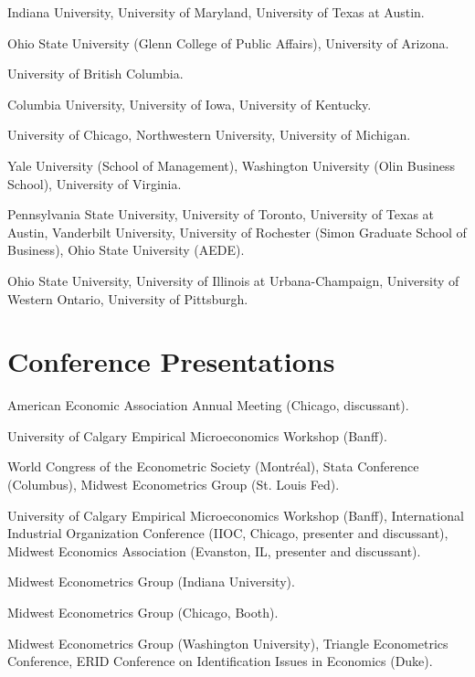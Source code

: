 \documentclass[10pt,letterpaper]{article}
\begin{document}
\begin{description}[font=\mdseries]
\item[2017]
  Indiana University,
  University of Maryland,
  University of Texas at Austin.
\item[2016]
  Ohio State University (Glenn College of Public Affairs),
  University of Arizona.
\item[2015]
  University of British Columbia.
\item[2014]
  Columbia University,
  University of Iowa,
  University of Kentucky.
\item[2013]
  University of Chicago,
  Northwestern University,
  University of Michigan.
\item[2012]
  Yale University (School of Management),
  Washington University (Olin Business School),
  University of Virginia.
\item[2011]
  Pennsylvania State University,
  University of Toronto,
  University of Texas at Austin,
  Vanderbilt University,
  University of Rochester (Simon Graduate School of Business),
  Ohio State University (AEDE).
\item[2010]
  Ohio State University,
  University of Illinois at Urbana-Champaign,
  University of Western Ontario,
  University of Pittsburgh.
\end{description}

\section*{Conference Presentations}

\begin{description}[font=\mdseries]
\item[2017]
  American Economic Association Annual Meeting (Chicago, discussant).
\item[2016]
  University of Calgary Empirical Microeconomics Workshop (Banff).
\item[2015]
  World Congress of the Econometric Society (Montr\'{e}al),
  Stata Conference (Columbus),
  Midwest Econometrics Group (St. Louis Fed).
\item[2014]
  University of Calgary Empirical Microeconomics Workshop (Banff),
  International Industrial Organization Conference (IIOC, Chicago, presenter and discussant),
  Midwest Economics Association (Evanston, IL, presenter and discussant).
\item[2013]
  Midwest Econometrics Group (Indiana University).
\item[2011]
  Midwest Econometrics Group (Chicago, Booth).
\item[2010]
  Midwest Econometrics Group (Washington University),
  Triangle Econometrics Conference,
  ERID Conference on Identification Issues in Economics (Duke).
\end{description}
\end{document}
